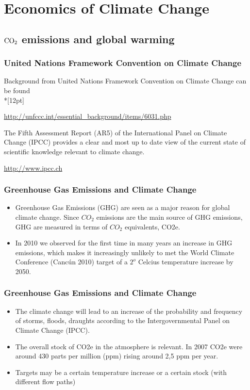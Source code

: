 \section{Economics of Climate Change}
\subsection[Emissions]{$\textnormal{CO}_2$ emissions and global warming}
\begin{frame}\frametitle{United Nations Framework Convention on Climate Change}

Background from United Nations Framework Convention on Climate Change can be found\\*[12pt]

\url{http://unfccc.int/essential_background/items/6031.php}

\vspace{12pt}
The Fifth Assessment Report (AR5) of the International Panel on Climate Change (IPCC) provides a clear and most up to date view of the current state of scientific knowledge relevant to climate change.

\url{http://www.ipcc.ch}

\end{frame}

\begin{frame} \frametitle{Greenhouse Gas Emissions and Climate Change}
\begin{itemize}
\item<1-> Greenhouse Gas Emissions (GHG) are seen as a major reason for global climate change. Since ${CO}_2$ emissions are the main source of GHG emissions, GHG are measured in terms of ${CO}_2$ equivalents, CO2e.
\item<2-> In 2010 we observed for the first time in many years an increase in GHG emissions, which makes it increasingly unlikely to met the World Climate Conference (Canc{\'u}n 2010) target of a $2^o$ Celcius temperature increase by 2050.
\end{itemize}
\end{frame}

\begin{frame} \frametitle{Greenhouse Gas Emissions and Climate Change}
\begin{itemize}
\item<1-> The climate change will lead to an increase of the probability and frequency of storms, floods, draughts according to the Intergovernmental Panel on Climate Change (IPCC).
\item<2-> The overall stock of CO2e in the atmosphere is relevant. In 2007 CO2e were around 430 parts per million (ppm) rising around 2,5 ppm per year.
\item<3-> Targets may be a certain temperature increase or a certain stock (with different flow paths)
\end{itemize}
\end{frame}


